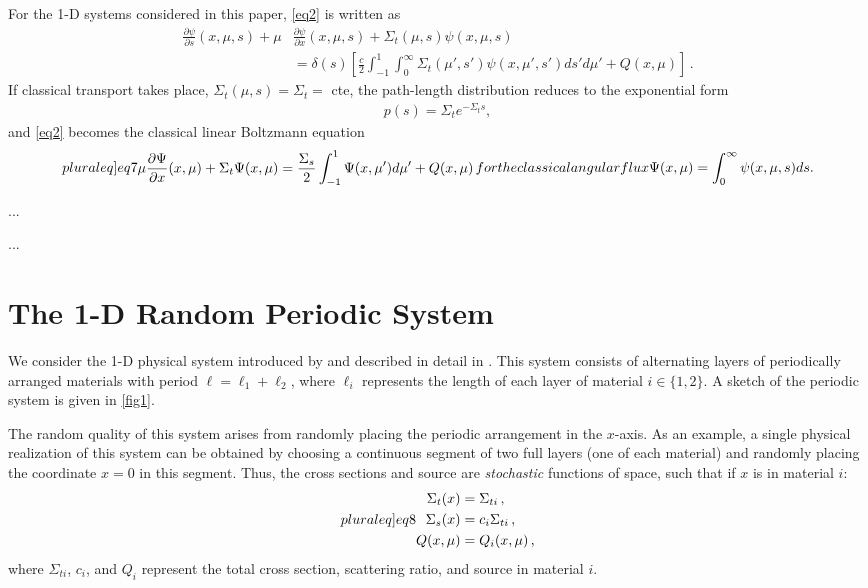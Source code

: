 \documentclass[12pt]{article}
\begin{document}
For the 1-D systems considered in this paper, \cref{eq2} is written as
\begin{align}\label{eq5}
\frac{\partial\psi}{\partial s}(x,\mu,s) + \mu&\frac{\partial \psi}{\partial x}(x,\mu,s) + \Sigma_t(\mu,s)\psi(x,\mu,s) 
\\& = \delta(s)\left[ \frac{c}{2}\int_{-1}^1\int_0^\infty \Sigma_t(\mu',s')\psi(x,\mu',s')ds' d\mu' + Q(x,\mu)\right]\,. \nonumber
\end{align}
If classical transport takes place, $\Sigma_t(\mu,s) = \Sigma_t =$ cte, 
the path-length distribution reduces to the exponential form
\begin{align}\label{eq6}
	p(s) = \Sigma_t e^{-\Sigma_t s},
\end{align}
and \cref{eq2} becomes the classical linear Boltzmann equation
\begin{subequations}\label[pluraleq]{eq7}
\begin{align}\label{eq7a}
\mu\frac{\partial\Psi}{\partial x}(x,\mu) + \Sigma_t\Psi(x,\mu) = \frac{\Sigma_s}{2}\int_{-1}^1\Psi(x,\mu')d\mu' +  Q(x,\mu) \,
\end{align}
for the classical angular flux 
\begin{align}
\Psi(x,\mu) = \int_0^\infty \psi(x,\mu,s)ds.
\end{align} 
\end{subequations}

...

...

\section{The 1-D Random Periodic System}\label{sec3}

We consider the 1-D physical system introduced by \cite{zuc94} and described in detail in \cite{nse16}.
This system consists of alternating layers of periodically arranged materials with period $\ell = \ell_1 + \ell_2$, where $\ell_i$ represents the length of each layer of material $i \in \{1,2\}$.
A sketch of the periodic system is given in \cref{fig1}.

The random quality of this system arises from randomly placing the periodic arrangement in the $x$-axis.
As an example, a single physical realization of this system can be obtained by choosing a continuous segment of two full layers (one of each material) and randomly placing the coordinate $x=0$ in this segment.
Thus, the cross sections and source are {\em stochastic} functions of space, such that if $x$ is in material $i$:
\begin{subequations}\label[pluraleq]{eq8}
\begin{align}
\Sigma_t(x) &= \Sigma_{ti}\, ,\\
\Sigma_s(x) &= c_i \Sigma_{ti}\, ,\\
Q(x,\mu) &= Q_i(x,\mu) \, ,
\end{align}
\end{subequations}
where $\Sigma_{ti}$, $c_i$, and $Q_i$ represent the total cross section, scattering ratio, and source in material $i$. 
\end{document}
